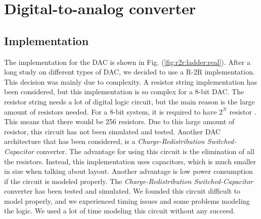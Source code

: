 \documentclass[english, 12pt, a4paper]{ifimaster}
\begin{document}
\section{Digital-to-analog converter}
\subsection{Implementation}
The implementation for the DAC is shown in Fig. (\ref{fig:r2r:ladder:real}). After a long study on different types of DAC, we decided to use a R-2R implementation. This decision was mainly due to 
complexity. A resistor string implementation has been considered, but this implementation is so complex for a 8-bit DAC. The resistor string needs a lot of digital logic circuit, but the main 
reason is the large amount of resistors needed. For a 8-bit system, it is required to have \(2^N\) resistor \cite{carusone}. This means that there would be 256 resistors. Due to this large amount of resistor, 
this circuit has not been simulated and tested. Another DAC architecture that has been considered, is a \textit{Charge-Redistribution Switched-Capacitor} converter. The advantage for using this circuit 
is the elimination of all the resistors. Instead, this implementation uses capacitors, which is much smaller in size when talking about layout. Another advantage is low power consumption if the
circuit is modeled properly. The \textit{Charge-Redistribution Switched-Capacitor} converter has been tested and simulated. We founded this circuit difficult to model properly, and we experienced 
timing issues and some problems modeling the logic. We used a lot of time modeling this circuit without any succeed.\\
\end{document}
